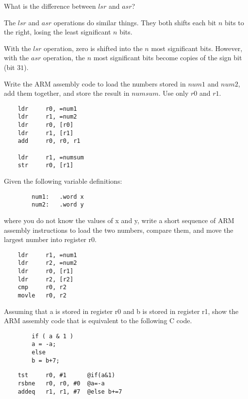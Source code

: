 \documentclass[12pt]{article}
\newenvironment{problem}[2][Problem]{\begin{trivlist}
\item[\hskip \labelsep {\bfseries #1}\hskip \labelsep {\bfseries #2.}]}{\end{trivlist}}
\begin{document}
\pagebreak

\begin{problem}{4.3}
    What is the difference between $lsr$ and $asr$?
\end{problem}

The $lsr$ and $asr$ operations do similar things. They both shifts each bit $n$ bits to the right, losing the least significant $n$ bits.

With the $lsr$ operation, zero is shifted into the $n$ most significant bits.
However, with the $asr$ operation, the $n$ most significant bits become copies of the sign bit (bit $31$).


\begin{problem}{4.4}
    Write the ARM assembly code to load the numbers stored in $num1$ and $num2$, add them together, and store the result in $numsum$. Use only $r0$ and $r1$.
\end{problem}

\begin{verbatim}
    ldr     r0, =num1
    ldr     r1, =num2
    ldr     r0, [r0]
    ldr     r1, [r1]
    add     r0, r0, r1
    
    ldr     r1, =numsum
    str     r0, [r1]
\end{verbatim}


\begin{problem}{4.5}
    Given the following variable definitions:
    \begin{verbatim}
        num1:   .word x
        num2:   .word y
    \end{verbatim}
    where you do not know the values of x and y, write a short sequence of ARM assembly instructions to load the two numbers, compare them, and move the largest number into register r0.
\end{problem}

\begin{verbatim}
    ldr     r1, =num1
    ldr     r2, =num2
    ldr     r0, [r1]
    ldr     r2, [r2]
    cmp     r0, r2
    movle   r0, r2
\end{verbatim}

\pagebreak

\begin{problem}{4.6}
    Assuming that a is stored in register r0 and b is stored in register r1, show the ARM assembly code that is equivalent to the following C code.
    \begin{verbatim}
        if ( a & 1 )
        a = -a;
        else
        b = b+7;
    \end{verbatim}

\end{problem}

\begin{verbatim}
    tst     r0, #1      @if(a&1)
    rsbne   r0, r0, #0  @a=-a
    addeq   r1, r1, #7  @else b+=7
\end{verbatim}
\end{document}
